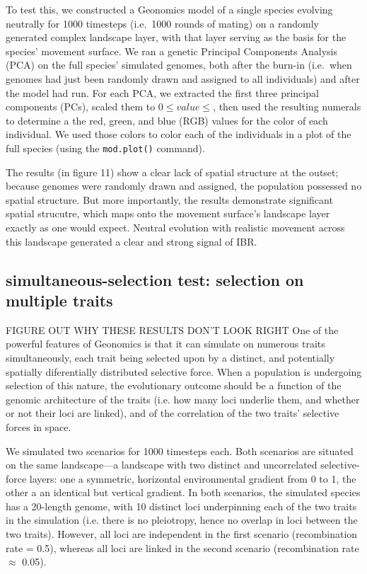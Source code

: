 ﻿\documentclass{article}
\begin{document}
To test this, we constructed a Geonomics model of a single species evolving neutrally
for 1000 timesteps (i.e.\ 1000 rounds of mating) on a randomly generated complex landscape layer,
with that layer serving as the basis for the species' movement surface.
We ran a genetic Principal Components Analysis (PCA) on the full species' simulated genomes,
both after the burn-in (i.e.\ when genomes had just been randomly drawn and assigned to all individuals)
and after the model had run. For each PCA, we extracted the first three principal components (PCs),
scaled them to $0\leq value\leq$, then used the resulting numerals to determine a the
red, green, and blue (RGB) values for the color of each individual.
We used those colors to color each of the individuals in a plot of the full species (using the \texttt{mod.plot()} command).

The results (in figure 11) show a clear lack of spatial structure at the outset; because genomes were randomly drawn and assigned,
the population possessed no spatial structure. But more importantly, the results demonstrate significant
spatial strucutre, which maps onto the movement surface's landscape layer exactly as one would expect.
Neutral evolution with realistic movement across this landscape generated a clear and strong signal of IBR.

\subsection{simultaneous-selection test: selection on multiple traits}
{\large FIGURE OUT WHY THESE RESULTS DON'T LOOK RIGHT}
One of the powerful features of Geonomics is that it can simulate on numerous traits simultaneously,
each trait being selected upon by a distinct, and potentially spatially diferentially distributed selective force.
When a population is undergoing selection of this nature, the evolutionary outcome should be a function of the
genomic architecture of the traits (i.e. how many loci underlie them, and whether or not their loci are linked),
and of the correlation of the two traits' selective forces in space.

We simulated two scenarios for 1000 timesteps each. Both scenarios are situated on the same
landscape---a landscape with two distinct and uncorrelated selective-force layers: 
one a symmetric, horizontal environmental gradient from 0 to 1, the other a
an identical but vertical gradient.
In both scenarios, the simulated species has a 20-length genome, with 10 distinct loci underpinning
each of the two traits in the simulation (i.e. there is no pleiotropy, hence no overlap
in loci between the two traits). However, all loci are independent in the first scenario (recombination
rate = 0.5), whereas all loci are linked in the second scenario (recombination rate $\approx$ 0.05).
\end{document}
